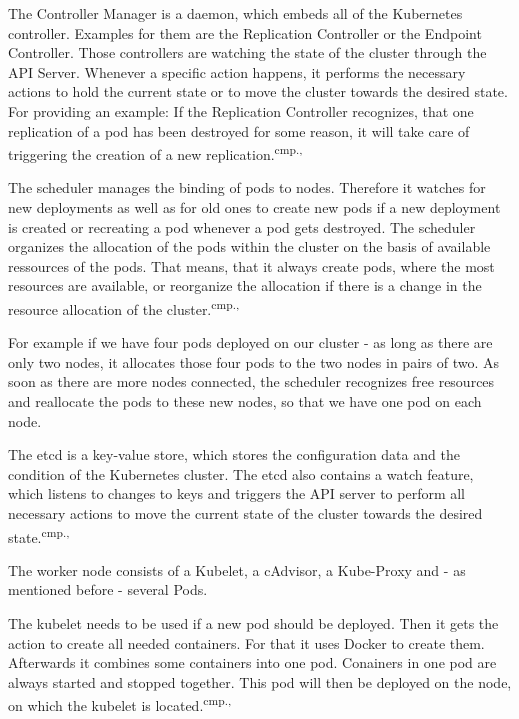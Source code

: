 The Controller Manager is a daemon, which embeds all of the Kubernetes controller. Examples for them are the Replication Controller or the Endpoint Controller. Those controllers are watching the state of the cluster through the API Server. Whenever a specific action happens, it performs the necessary actions to hold the current state or to move the cluster towards the desired state. For providing an example: If the Replication Controller recognizes, that one replication of a pod has been destroyed for some reason, it will take care of triggering the creation of a new replication.\textsuperscript{cmp.\cite{13}, \cite{16}}

The scheduler manages the binding of pods to nodes. Therefore it watches for new deployments as well as for old ones to create new pods if a new deployment is created or recreating a pod whenever a pod gets destroyed. The scheduler organizes the allocation of the pods within the cluster on the basis of available ressources of the pods. That means, that it always create pods, where the most resources are available, or reorganize the allocation if there is a change in the resource allocation of the cluster.\textsuperscript{cmp.\cite{13}, \cite{16}}%

For example if we have four pods deployed on our cluster - as long as there are only two nodes, it allocates those four pods to the two nodes in pairs of two. As soon as there are more nodes connected, the scheduler recognizes free resources and reallocate the pods to these new nodes, so that we have one pod on each node.

The etcd is a key-value store, which stores the configuration data and the condition of the Kubernetes cluster. The etcd also contains a watch feature, which listens to changes to keys and triggers the API server to perform all necessary actions to move the current state of the cluster towards the desired state.\textsuperscript{cmp.\cite{13}, \cite{16}}

The worker node consists of a Kubelet, a cAdvisor, a Kube-Proxy and - as mentioned before - several Pods. 

The kubelet needs to be used if a new pod should be deployed. Then it gets the action to create all needed containers. For that it uses Docker to create them. Afterwards it combines some containers into one pod. Conainers in one pod are always started and stopped together. This pod will then be deployed on the node, on which the kubelet is located.\textsuperscript{cmp.\cite{13}, \cite{16}}

